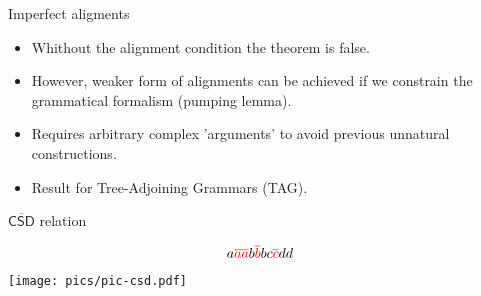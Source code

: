 \documentclass{beamer}
\begin{document}
\begin{frame}{Imperfect aligments}
  \begin{itemize}
  \item Whithout the alignment condition the theorem is false.
  \item However, weaker form of alignments can be achieved if we constrain the grammatical formalism (pumping lemma).
  \item \alert{Requires arbitrary complex 'arguments' to avoid previous unnatural constructions.} 
  \item Result for Tree-Adjoining Grammars (TAG).
  \end{itemize}

  \begin{block}{$\overline{\mathsf{CSD}}$ relation}
    \begin{minipage}{0.3\linewidth}
      \[a\textcolor{red}{\overline{aa}}b\textcolor{red}{\overline{b}}bc\textcolor{red}{\overline{c}}dd\]
    \end{minipage}
    \begin{minipage}{0.69\linewidth}
      \begin{center}
        \texttt{[image: pics/pic-csd.pdf]}
      \end{center}
    \end{minipage}
  \end{block}
  
\end{frame}
\end{document}
